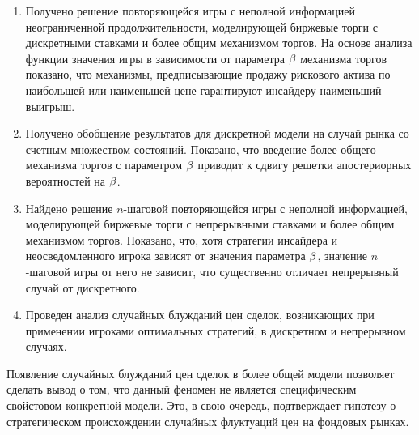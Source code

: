 \begin{enumerate}
  \item
    Получено решение повторяющейся игры с неполной информацией неограниченной продолжительности, моделирующей биржевые торги с дискретными ставками и более общим механизмом торгов.
    На основе анализа функции значения игры в зависимости от параметра $\beta$ механизма торгов показано, что механизмы, предписывающие продажу рискового актива по наибольшей или наименьшей цене гарантируют инсайдеру наименьший выигрыш.
  \item
    Получено обобщение результатов для дискретной модели на случай рынка со счетным множеством состояний.
    Показано, что введение более общего механизма торгов с параметром $\beta$ приводит к сдвигу решетки апостериорных вероятностей на $\beta$.
  \item
    Найдено решение $n$-шаговой повторяющейся игры с неполной информацией, моделирующей биржевые торги с непрерывными ставками и более общим механизмом торгов.
    Показано, что, хотя стратегии инсайдера и неосведомленного игрока зависят от значения параметра $\beta$, значение $n$-шаговой игры от него не зависит, что существенно отличает непрерывный случай от дискретного.
  \item
    Проведен анализ случайных блужданий цен сделок, возникающих при применении игроками оптимальных стратегий, в дискретном и непрерывном случаях.
\end{enumerate}


Появление случайных блужданий цен сделок в более общей модели позволяет сделать вывод о том, что данный феномен не является специфическим свойстовом конкретной модели.
Это, в свою очередь, подтверждает гипотезу о стратегическом происхождении случайных флуктуаций цен на фондовых рынках.

